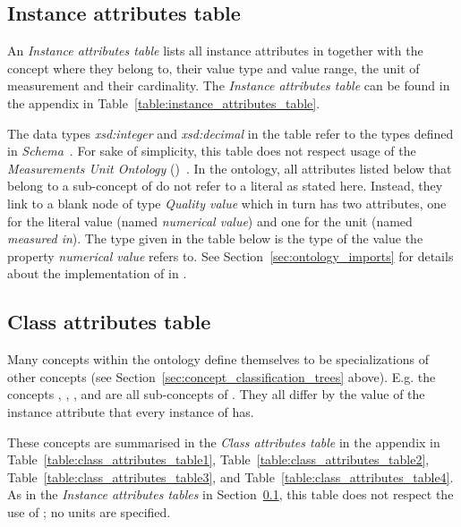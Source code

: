 \subsection{Instance attributes table}
\label{subsec:instance_attributes_table}

An \emph{Instance attributes table} lists all instance attributes in \smarthomeweather together with the concept where they belong to, their value type and value range, the unit of measurement and their cardinality. The \emph{Instance attributes table} can be found in the appendix in Table~\ref{table:instance_attributes_table}.

The data types \emph{xsd:integer} and \emph{xsd:decimal} in the table refer to the types defined in \emph{ Schema}~\cite{xml-schema-datatypes}. For sake of simplicity, this table does not respect usage of the \emph{Measurements Unit Ontology} (\muo)~\cite{MUO}. In the ontology, all attributes listed below that belong to a sub-concept of  do not refer to a literal as stated here. Instead, they link to a blank node of type \emph{Quality value} which in turn has two attributes, one for the literal value (named \emph{numerical value}) and one for the unit (named \emph{measured in}). The type given in the table below is the type of the value the property \emph{numerical value} refers to. See Section~\ref{sec:ontology_imports} for details about the implementation of \muo in \smarthomeweather.

\subsection{Class attributes table}
\label{subsec:class_attributes_table}

Many concepts within the \smarthomeweather ontology define themselves to be specializations of other concepts (see Section~\ref{sec:concept_classification_trees} above). E.g. the concepts , , ,  and  are all sub-concepts of . They all differ by the value of the instance attribute  that every instance of  has.

These concepts are summarised in the \emph{Class attributes table} in the appendix in Table~\ref{table:class_attributes_table1}, Table~\ref{table:class_attributes_table2}, Table~\ref{table:class_attributes_table3}, and Table~\ref{table:class_attributes_table4}. As in the \emph{Instance attributes tables} in Section~\ref{subsec:instance_attributes_table}, this table does not respect the use of \muo; no units are specified.

